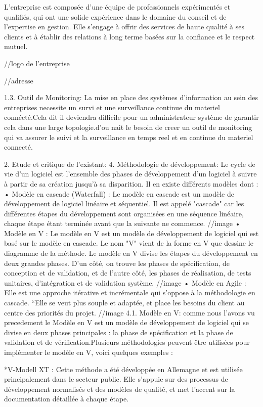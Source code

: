 \documentclass{report}
\begin{document}
L'entreprise est composée d'une équipe de professionnels expérimentés et qualifiés, qui ont une solide expérience dans le domaine du conseil et de l'expertise en gestion. Elle s'engage à offrir des services de haute qualité à ses clients et à établir des relations à long terme basées sur la confiance et le respect mutuel.

//logo de l'entreprise

//adresse

1.3. Outil de Monitoring:
La mise en place des systèmes d'information au sein des entreprises necessite un survi et une surveillance continue du materiel connécté.Cela dit il deviendra difficile pour un administrateur système de garantir cela dans une large topologie.d'ou nait le besoin de creer un outil de monitoring qui va assurer le suivi et la surveillance en temps reel et en continue du materiel connecté.

2. Etude et critique de l’existant:
4. Méthodologie de développement:
Le cycle de vie d’un logiciel est l’ensemble des phases de développement d’un logiciel à suivre
à partir de sa création jusqu’à sa disparition. Il en existe différents modèles dont :
• Modèle en cascade (Waterfall) : Le modèle en cascade est un modèle de développement de logiciel linéaire et séquentiel. Il est appelé "cascade" car les différentes étapes du développement sont organisées en une séquence linéaire, chaque étape étant terminée avant que la suivante ne commence. 
//image
• Modèle en V :
Le modèle en V est un modèle de développement de logiciel qui est basé sur le modèle en cascade. Le nom "V" vient de la forme en V que dessine le diagramme de la méthode.
Le modèle en V divise les étapes du développement en deux grandes phases. D'un côté, on trouve les phases de spécification, de conception et de validation, et de l'autre côté, les phases de réalisation, de tests unitaires, d'intégration et de validation système.
//image
• Modèle en Agile :
Elle est une approche itérative et incrémentale qui s'oppose à la 
méthodologie en cascade. “Elle se veut plus souple et adaptée, et place les besoins du 
client au centre des priorités du projet.
//image
4.1. Modèle en V:
comme nous l'avons vu precedement le Modèle en V est un modèle de développement de logiciel qui se divise en deux phases principales : la phase de spécification et la phase de validation et de vérification.Plusieurs méthodologies peuvent être utilisées pour implémenter le modèle en V, voici quelques exemples :

*V-Modell XT : Cette méthode a été développée en Allemagne et est utilisée principalement dans le secteur public. Elle s'appuie sur des processus de développement normalisés et des modèles de qualité, et met l'accent sur la documentation détaillée à chaque étape.
\end{document}

